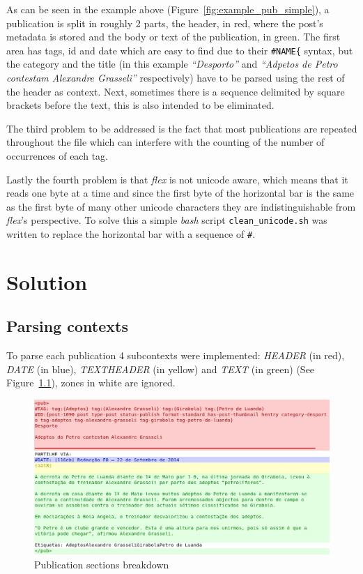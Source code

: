\documentclass[a4paper]{report}
\begin{document}
As can be seen in the example above (Figure~\ref{fig:example_pub_simple}), a
publication is split in roughly 2 parts, the header, in red, where the post's
metadata is stored and the body or text of the publication, in green. The first
area has tags, id and date which are easy to find due to their
\texttt{\#NAME\{} syntax, but the category and the title (in this example
\textit{``Desporto''} and \textit{``Adpetos de Petro contestam Alexandre
Grasseli''} respectively) have to be parsed using the rest of the header as
context. Next, sometimes there is a sequence delimited by square brackets before
the text, this is also intended to be eliminated.

The third problem to be addressed is the fact that most publications
are repeated throughout the file which can interfere with the counting of the
number of occurrences of each tag.

Lastly the fourth problem is that \textit{flex} is not unicode aware,
which means that it reads one byte at a time and since the first byte of the
horizontal bar is the same as the first byte of many other unicode characters
they are indistinguishable from \textit{flex}'s perspective. To solve this a
simple \textit{bash} script \texttt{clean\_unicode.sh} was written to replace
the horizontal bar with a sequence of \verb!#!.

\chapter{Solution}

\section{Parsing contexts}

To parse each publication 4 subcontexts were implemented: \textit{HEADER} (in
red), \textit{DATE} (in blue), \textit{TEXTHEADER} (in yellow) and
\textit{TEXT} (in green) (See Figure~\ref{fig:example_pub_colored}), zones in
white are ignored.

\begin{figure}[H]
    \includegraphics[width=\textwidth]{./example_pub_colored.png}
    \caption{Publication sections breakdown}\label{fig:example_pub_colored}
\end{figure}
\end{document}
